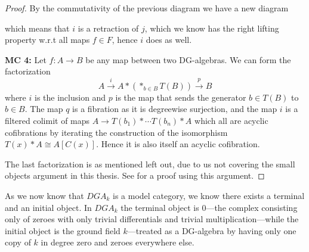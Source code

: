 \begin{proof}
By the commutativity of the previous diagram we have a new diagram 
\begin{center}
\end{center}
which means that $i$ is a retraction of $j$, which we know has the right lifting property w.r.t all maps $f\in F$, hence $i$ does as well.



\textbf{MC 4:} Let $f:A\longrightarrow B$ be any map between two DG-algebras. We can form the factorization 
\begin{equation*}
    A\overset{i}\longrightarrow A\ast (\ast_{b\in B} T(B))\overset{p}\longrightarrow B
\end{equation*}
where $i$ is the inclusion and $p$ is the map that sends the generator $b \in T(B)$ to $b\in B$. The map $q$ is a fibration as it is  degreewise surjection, and the map $i$ is a filtered colimit of maps $A\longrightarrow T(b_1)\ast \cdots T(b_n)\ast A$ which all are acyclic cofibrations by iterating the construction of the isomorphism $T(x)\ast A \cong A[C(x)]$. Hence it is also itself an acyclic cofibration. 

The last factorization is as mentioned left out, due to us not covering the small objects argument in this thesis. See \cite[Lemma 3]{jardine} for a proof using this argument. 
\end{proof}


As we now know that $DGA_k$ is a model category, we know there exists a terminal and an initial object. In $DGA_k$ the terminal object is $0$---the complex consisting only of zeroes with only trivial differentials and trivial multiplication---while the initial object is the ground field $k$---treated as a DG-algebra by having only one copy of $k$ in degree zero and zeroes everywhere else. 

